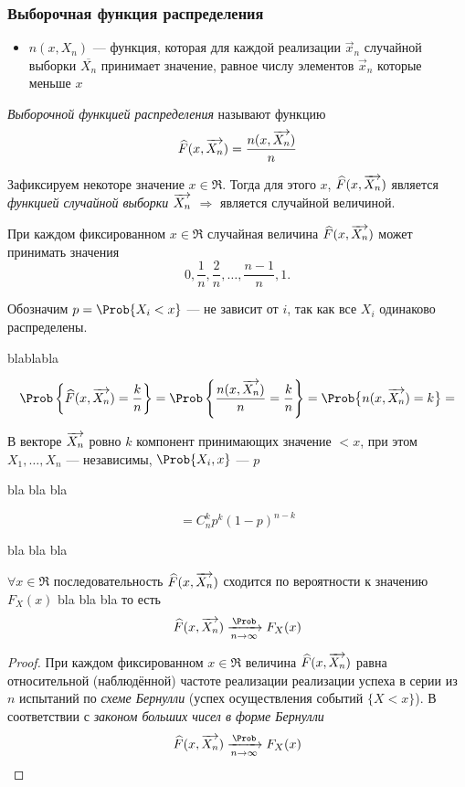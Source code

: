\subsubsection{Выборочная функция распределения}

\begin{itemize}
	\item $n(x, X_n)$ --- функция, которая для каждой реализации $\vec{x}_n$ случайной выборки $\overline{X_n}$ принимает значение, равное числу элементов $\vec{x}_n$ которые меньше $x$
\end{itemize}

\begin{defn}
	\emph{Выборочной функцией распределения} называют функцию
	\begin{equation}
		\widehat{F}(x, \overrightarrow{X_n}) = \frac{n(x, \overrightarrow{X_n})}{n}
	\end{equation}
\end{defn}
\begin{rem}
	Зафиксируем некоторе значение $x \in \Re$. Тогда для этого $x$, $\widehat{F}(x, \overrightarrow{X_n})$ является \emph{функцией случайной выборки $\overrightarrow{X_n}$} $\Rightarrow$ является случайной величиной.
\end{rem}
\begin{rem}
	При каждом фиксированном $x \in \Re$ случайная величина $\widehat{F}(x, \overrightarrow{X_n})$ может принимать значения
	\[
		0, \frac{1}{n}, \frac{2}{n}, \dots, \frac{n-1}{n}, 1.
	\]
\end{rem}

Обозначим $p = \Prob \{ X_i < x \}$ --- не зависит от $i$, так как все $X_i$ одинаково распределены.

blablabla

\[
	\Prob \left\{ \widehat{F}(x, \vvec{X_n}) = \frac{k}{n} \right\} = \Prob \left\{ \frac{n(x, \vvec{X_n})}{n} = \frac{k}{n} \right\} = \Prob \bigl\{ n(x, \vvec{X_n}) = k \bigr\} = 
\]

В векторе $\overrightarrow{X_n}$ ровно $k$ компонент принимающих значение $< x$, при этом $X_1, \dots, X_n$ --- независимы, $\Prob \{ X_i , x \}$ --- $p$ 

bla bla bla

\[
	= C_n^k p^k (1 - p)^{n-k}
\]

bla bla bla

\begin{thm}
	$\forall x \in \Re$ последовательность $\widehat{F}(x, \overrightarrow{X_n})$ сходится по вероятности к значению $F_{X}(x)$ bla bla bla то есть
	\begin{equation}
		\widehat{F}(x, \vvec{X_n}) \xrightarrow[n\to\infty]{\Prob} F_{X}(x)
	\end{equation}
\end{thm}
\begin{proof}
	При каждом фиксированном $x \in \Re$ величина $\widehat{F}(x, \overrightarrow{X_n})$ равна относительной (наблюдённой) частоте реализации реализации успеха в серии из $n$ испытаний по \emph{схеме Бернулли} (успех осуществления событий $\{ X < x \}$). В соответствии с \emph{законом больших чисел в форме Бернулли}
	\[
		\widehat{F}(x, \vvec{X_n}) \xrightarrow[n\to\infty]{\Prob} F_{X}(x)
	\]
\end{proof}


